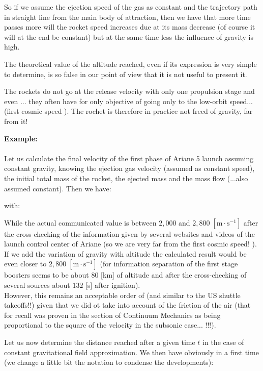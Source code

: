 	So if we assume the ejection speed of the gas as constant and the trajectory path in straight line from the main body of attraction, then we have that more time passes more will the rocket speed increases due at its mass decrease (of course it will at the end be constant) but at the same time less the influence of gravity is high.
	
	The theoretical value of the altitude reached, even if its expression is very simple to determine, is so false in our point of view that it is not useful to present it.
	
	The rockets do not go at the release velocity with only one propulsion stage and even ... they often have for only objective of going only to the low-orbit speed... (first cosmic speed ). The rochet is therefore in practice not freed of gravity, far from it!
	\begin{tcolorbox}[colframe=black,colback=white,sharp corners]
	\textbf{{\Large {}}Example:}\\\\
	Let us calculate the final velocity of the first phase of Ariane 5 launch assuming constant gravity, knowing the ejection gas velocity (assumed as constant speed), the initial total mass of the rocket, the ejected mass and the mass flow (...also assumed constant). Then we have:
	
	with:
	
	While the actual communicated value is between $2,000$ and $2,800\; [\text{m}\cdot\text{s}^{-1}]$ after the cross-checking of the information given by several websites and videos of the launch control center of Ariane (so we are very far from the first cosmic speed! ). If we add the variation of gravity with altitude the calculated result would be even closer to $2,800\; [\text{m}\cdot\text{s}^{-1}]$ (for information separation of the first stage boosters seems to be about $80$ [km] of altitude and after the cross-checking of several sources about $132$ [s] after ignition).\\
	
	However, this remains an acceptable order of (and similar to the US shuttle takeoffs!!) given that we did ot take into account of the friction of the air (that for recall was proven in the section of Continuum Mechanics as being proportional to the square of the velocity in the subsonic case... !!!).
	\end{tcolorbox}
	Let us now determine the distance reached after a given time $t$ in the case of constant gravitational field approximation. We then have obviously in a first time (we change a little bit the notation to condense the developments):
	
